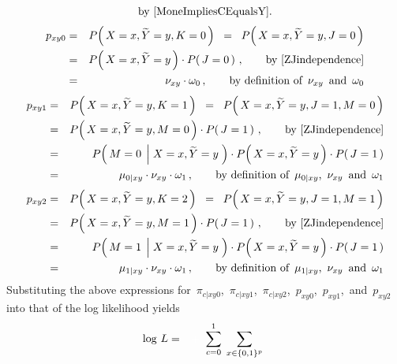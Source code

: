 \begin{enumerate}
\begin{eqnarray*}
	\textnormal{by \eqref{MoneImpliesCEqualsY}.}
\end{eqnarray*}
\begin{eqnarray*}
p_{xy0}
&=&
	P\!\left(\,X=x,\widetilde{Y}=y,K=0\,\right)
\;\;=\;\;
	P\!\left(\,X=x,\widetilde{Y}=y,J=0\,\right)
\\
&=&
	P\!\left(\,X=x,\widetilde{Y}=y\,\right)
	\cdot
	P\!\left(\,J=0\,\right)\,,
	\quad\quad
	\textnormal{by \eqref{ZJindependence}}
\\
&=&
	\nu_{xy}
	\cdot
	\omega_{0}\,,
	\quad\quad
	\textnormal{by definition of \,$\nu_{xy}$\, and \,$\omega_{0}$}
\end{eqnarray*}
\begin{eqnarray*}
p_{xy1}
&=&
	P\!\left(\,X=x,\widetilde{Y}=y,K=1\,\right)
\;\;=\;\;
	P\!\left(\,X=x,\widetilde{Y}=y,J=1,M=0\,\right)
\\
&=&
	P\!\left(\,X=x,\widetilde{Y}=y,M=0\,\right)
	\cdot
	P\!\left(\,J=1\,\right)\,,
	\quad\quad
	\textnormal{by \eqref{ZJindependence}}
\\
&=&
	P\!\left(\,M=0\;\left\vert\;X=x,\widetilde{Y}=y\right.\,\right)
	\cdot
	P\!\left(\,X=x,\widetilde{Y}=y\,\right)
	\cdot
	P\!\left(\,J=1\,\right)
\\
&=&
	\mu_{0 \vert xy}
	\cdot
	\nu_{xy}
	\cdot
	\omega_{1}\,,
	\quad\quad
	\textnormal{by definition of \,$\mu_{0 \vert xy}$, \,$\nu_{xy}$\, and \,$\omega_{1}$}
\end{eqnarray*}
\begin{eqnarray*}
p_{xy2}
&=&
	P\!\left(\,X=x,\widetilde{Y}=y,K=2\,\right)
\;\;=\;\;
	P\!\left(\,X=x,\widetilde{Y}=y,J=1,M=1\,\right)
\\
&=&
	P\!\left(\,X=x,\widetilde{Y}=y,M=1\,\right)
	\cdot
	P\!\left(\,J=1\,\right)\,,
	\quad\quad
	\textnormal{by \eqref{ZJindependence}}
\\
&=&
	P\!\left(\,M=1\;\left\vert\;X=x,\widetilde{Y}=y\right.\,\right)
	\cdot
	P\!\left(\,X=x,\widetilde{Y}=y\,\right)
	\cdot
	P\!\left(\,J=1\,\right)
\\
&=&
	\mu_{1 \vert xy}
	\cdot
	\nu_{xy}
	\cdot
	\omega_{1}\,,
	\quad\quad
	\textnormal{by definition of \,$\mu_{1 \vert xy}$, \,$\nu_{xy}$\, and \,$\omega_{1}$}
\end{eqnarray*}
Substituting the above expressions for
\,$\pi_{c \vert xy0}$,
\,$\pi_{c \vert xy1}$,
\,$\pi_{c \vert xy2}$,
\,$p_{xy0}$,
\,$p_{xy1}$,
\,and
\,$p_{xy2}$
\,into that of the log likelihood yields
\begin{eqnarray*}
\log\,L
&=&
	{\color{white}+} \;\;
	\overset{1}{\underset{c=0}{\sum}}
	\;\,\underset{x\in\{0,1\}^{p}}{\sum}\;\,

\end{eqnarray*}
\end{enumerate}
